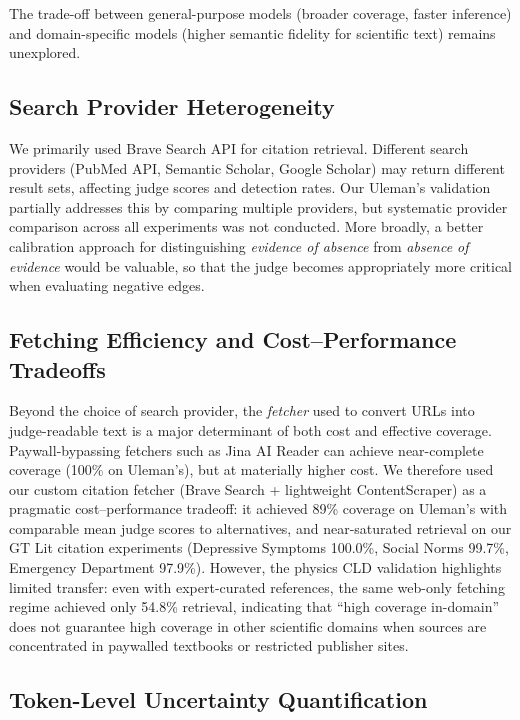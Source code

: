 The trade-off between general-purpose models (broader coverage, faster inference) and domain-specific models (higher semantic fidelity for scientific text) remains unexplored.

\subsection{Search Provider Heterogeneity}

We primarily used Brave Search API for citation retrieval. Different search providers (PubMed API, Semantic Scholar, Google Scholar) may return different result sets, affecting judge scores and detection rates. Our Uleman's validation partially addresses this by comparing multiple providers, but systematic provider comparison across all experiments was not conducted. More broadly, a better calibration approach for distinguishing \textit{evidence of absence} from \textit{absence of evidence} would be valuable, so that the judge becomes appropriately more critical when evaluating negative edges.

\subsection{Fetching Efficiency and Cost--Performance Tradeoffs}

Beyond the choice of search provider, the \textit{fetcher} used to convert URLs into judge-readable text is a major determinant of both cost and effective coverage. Paywall-bypassing fetchers such as Jina AI Reader can achieve near-complete coverage (100\% on Uleman's), but at materially higher cost. We therefore used our custom citation fetcher (Brave Search + lightweight ContentScraper) as a pragmatic cost--performance tradeoff: it achieved 89\% coverage on Uleman's with comparable mean judge scores to alternatives, and near-saturated retrieval on our GT Lit citation experiments (Depressive Symptoms 100.0\%, Social Norms 99.7\%, Emergency Department 97.9\%). However, the physics CLD validation highlights limited transfer: even with expert-curated references, the same web-only fetching regime achieved only 54.8\% retrieval, indicating that ``high coverage in-domain'' does not guarantee high coverage in other scientific domains when sources are concentrated in paywalled textbooks or restricted publisher sites.

\subsection{Token-Level Uncertainty Quantification}

